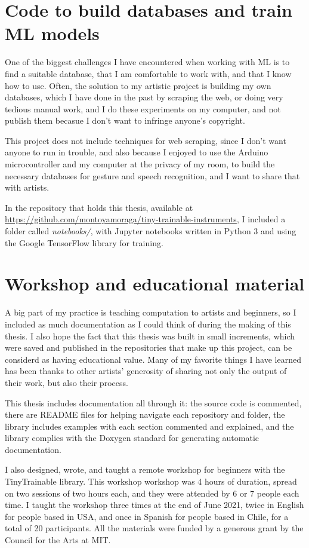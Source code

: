 \section{Code to build databases and train ML models}

One of the biggest challenges I have encountered when working with \acrshort{ML} is to find a suitable database, that I am comfortable to work with, and that I know how to use. Often, the solution to my artistic project is building my own databases, which I have done in the past by scraping the web, or doing very tedious manual work, and I do these experiments on my computer, and not publish them becasue I don't want to infringe anyone's copyright.

This project does not include techniques for web scraping, since I don't want anyone to run in trouble, and also because I enjoyed to use the Arduino microcontroller and my computer at the privacy of my room, to build the necessary databases for gesture and speech recognition, and I want to share that with artists.

In the repository that holds this thesis, available at \url{https://github.com/montoyamoraga/tiny-trainable-instruments}, I included a folder called \emph{notebooks/}, with Jupyter notebooks written in Python 3 and using the Google TensorFlow library for training.

\section{Workshop and educational material}

A big part of my practice is teaching computation to artists and beginners, so I included as much documentation as I could think of during the making of this thesis. I also hope the fact that this thesis was built in small increments, which were saved and published in the repositories that make up this project, can be considerd as having  educational value. Many of my favorite things I have learned has been thanks to other artists' generosity of sharing not only the output of their work, but also their process.

This thesis includes documentation all through it: the source code is commented, there are README files for helping navigate each repository and folder, the library includes examples with each section commented and explained, and the library complies with the Doxygen standard for generating automatic documentation.

I also designed, wrote, and taught a remote workshop for beginners with the TinyTrainable library. This workshop workshop was 4 hours of duration, spread on two sessions of two hours each, and they were attended by 6 or 7 people each time. I taught the workshop three times at the end of June 2021, twice in English for people based in USA, and once in Spanish for people based in Chile, for a total of 20 participants. All the materials were funded by a generous grant by the Council for the Arts at MIT.

